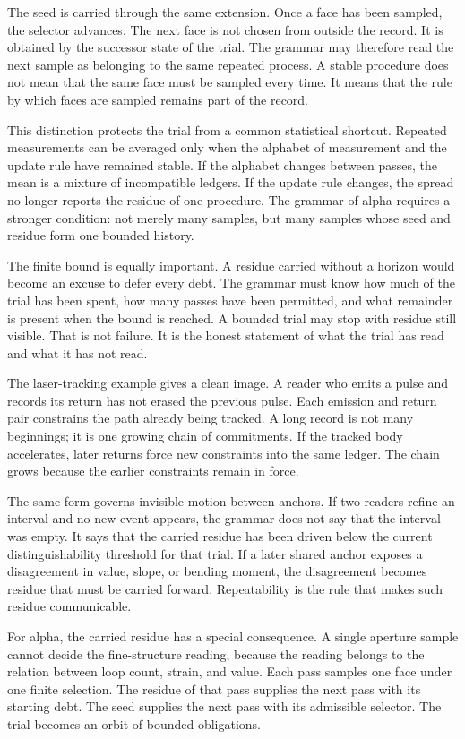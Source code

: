 The seed is carried through the same extension. Once a face has been sampled,
the selector advances. The next face is not chosen from outside the record.
It is obtained by the successor state of the trial. The grammar may therefore
read the next sample as belonging to the same repeated process. A stable
procedure does not mean that the same face must be sampled every time. It
means that the rule by which faces are sampled remains part of the record.

This distinction protects the trial from a common statistical shortcut.
Repeated measurements can be averaged only when the alphabet of measurement
and the update rule have remained stable. If the alphabet changes between
passes, the mean is a mixture of incompatible ledgers. If the update rule
changes, the spread no longer reports the residue of one procedure. The
grammar of alpha requires a stronger condition: not merely many samples, but
many samples whose seed and residue form one bounded history.

The finite bound is equally important. A residue carried without a horizon
would become an excuse to defer every debt. The grammar must know how much
of the trial has been spent, how many passes have been permitted, and what
remainder is present when the bound is reached. A bounded trial may stop with
residue still visible. That is not failure. It is the honest statement of
what the trial has read and what it has not read.

The laser-tracking example gives a clean image. A reader who emits a pulse
and records its return has not erased the previous pulse. Each emission and
return pair constrains the path already being tracked. A long record is not
many beginnings; it is one growing chain of commitments. If the tracked body
accelerates, later returns force new constraints into the same ledger. The
chain grows because the earlier constraints remain in force.

The same form governs invisible motion between anchors. If two readers refine
an interval and no new event appears, the grammar does not say that the
interval was empty. It says that the carried residue has been driven below
the current distinguishability threshold for that trial. If a later shared
anchor exposes a disagreement in value, slope, or bending moment, the
disagreement becomes residue that must be carried forward. Repeatability is
the rule that makes such residue communicable.

For alpha, the carried residue has a special consequence. A single aperture
sample cannot decide the fine-structure reading, because the reading belongs
to the relation between loop count, strain, and value. Each pass samples one
face under one finite selection. The residue of that pass supplies the next
pass with its starting debt. The seed supplies the next pass with its
admissible selector. The trial becomes an orbit of bounded obligations.

